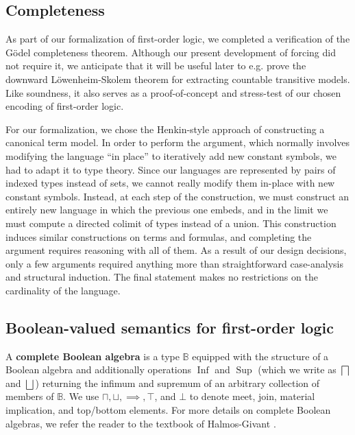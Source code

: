 \documentclass[a4paper,USenglish,cleveref, autoref]{lipics-v2019}
\newcommand{\B}{\mathbb{B}}
\theoremstyle{theorem}
\theoremstyle{definition}
\begin{document}
\subsection{Completeness}
As part of our formalization of first-order logic, we completed a verification of the G\"odel completeness theorem. Although our present development of forcing did not require it, we anticipate that it will be useful later to e.g. prove the downward L\"owenheim-Skolem theorem for extracting countable transitive models. Like soundness, it also serves as a proof-of-concept and stress-test of our chosen encoding of first-order logic.

For our formalization, we chose the Henkin-style approach of constructing a canonical term model. In order to perform the argument, which normally involves modifying the language ``in place'' to iteratively add new constant symbols, we had to adapt it to type theory. Since our languages are represented by pairs of indexed types instead of sets, we cannot really modify them in-place with new constant symbols. Instead, at each step of the construction, we must construct an entirely new language in which the previous one embeds, and in the limit we must compute a directed colimit of types instead of a union. This construction induces similar constructions on terms and formulas, and completing the argument requires reasoning with all of them. As a result of our design decisions, only a few arguments required anything more than straightforward case-analysis and structural induction. The final statement makes no restrictions on the cardinality of the language.

\subsection{Boolean-valued semantics for first-order logic}

A \textbf{complete Boolean algebra} is a type $\B$ equipped with the structure of a Boolean algebra and additionally operations $\operatorname{Inf}$ and $\operatorname{Sup}$ (which we write as $\bigsqcap$ and $\bigsqcup$) returning the infimum and supremum of an arbitrary collection of members of $\B$. We use $\sqcap, \sqcup, \implies, \top$, and $\bot$ to denote meet, join, material implication, and top/bottom elements. For more details on complete Boolean algebras, we refer the reader to the textbook of Halmos-Givant \cite{givant2008introduction}.
\end{document}
